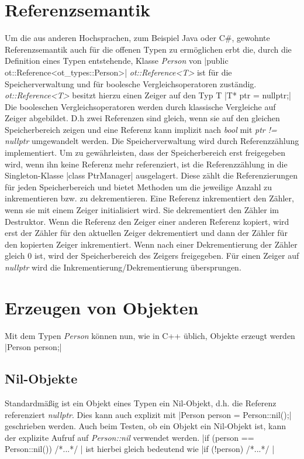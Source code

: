 \documentclass[oneside]{ausarbeitung}
\begin{document}
\section{Referenzsemantik}
\label{sub:objects_references}
Um die aus anderen Hochsprachen, zum Beispiel Java oder C{\#}, gewohnte Referenzsemantik auch für die offenen Typen zu ermöglichen erbt die, durch die Definition eines Typen entstehende, Klasse \textit{Person} von 
|public ot::Reference<ot_types::Person>|
\textit{ot::Reference<T>} ist für die Speicherverwaltung und für boolesche Vergleichsoperatoren zuständig. \textit{ot::Reference<T>} besitzt hierzu einen Zeiger auf den Typ T 
|T* ptr = nullptr;| 
Die booleschen Vergleichsoperatoren werden durch klassische Vergleiche auf Zeiger abgebildet. D.h zwei Referenzen sind gleich, wenn sie auf den gleichen Speicherbereich zeigen und eine Referenz kann implizit nach \textit{bool} mit \textit{ptr != nullptr} umgewandelt werden. Die Speicherverwaltung wird durch Referenzzählung implementiert. Um zu gewährleisten, dass der Speicherbereich erst freigegeben wird, wenn ihn keine Referenz mehr referenziert, ist die Referenzzählung in die Singleton-Klasse
|class PtrManager| 
ausgelagert. Diese zählt die Referenzierungen für jeden Speicherbereich und bietet Methoden um die jeweilige Anzahl zu inkrementieren bzw. zu dekrementieren. Eine Referenz inkrementiert den Zähler, wenn sie mit einem Zeiger initialisiert wird. Sie dekrementiert den Zähler im Destruktor. Wenn die Referenz den Zeiger einer anderen Referenz kopiert, wird erst der Zähler für den aktuellen Zeiger dekrementiert und dann der Zähler für den kopierten Zeiger inkrementiert. Wenn nach einer Dekrementierung der Zähler gleich 0 ist, wird der Speicherbereich des Zeigers freigegeben. Für einen Zeiger auf \textit{nullptr} wird die Inkrementierung/Dekrementierung übersprungen.

\section{Erzeugen von Objekten}
\label{sec:objects}
Mit dem Typen \textit{Person} können nun, wie in C++ üblich, Objekte erzeugt werden
|Person person;| 

\subsection{Nil-Objekte}
\label{sub:objects_nil}
Standardmäßig ist ein Objekt eines Typen ein Nil-Objekt, d.h. die Referenz referenziert \textit{nullptr}. Dies kann auch explizit mit
|Person person = Person::nil();|
geschrieben werden. Auch beim Testen, ob ein Objekt ein Nil-Objekt ist, kann der explizite Aufruf auf \textit{Person::nil} verwendet werden.
|if (person == Person::nil()) { /*...*/ }| 
ist hierbei gleich bedeutend wie 
|if (!person) { /*...*/ }| 
\end{document}
